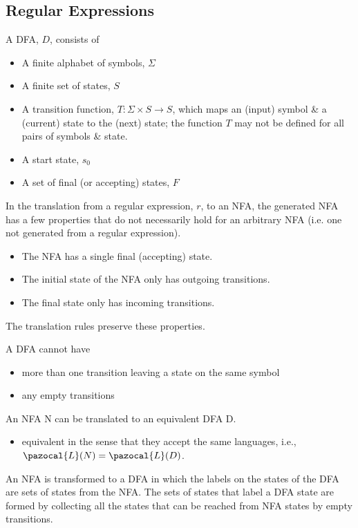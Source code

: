 \subsection{Regular Expressions}
A DFA, $D$, consists of
\begin{itemize}
    \item A finite alphabet of symbols, $\Sigma$
    \item A finite set of states, $S$
    \item A transition function, $T : \Sigma \times S \rightarrow S$, which maps an (input) symbol \& a (current) state to the (next) state; the function $T$ may not be defined for all pairs of symbols \& state. 
    \item A start state, $s_0$ 
    \item A set of final (or accepting) states, $F$
\end{itemize}


In the translation from a regular expression, $r$, to an NFA, the generated NFA has a few properties that do not necessarily hold for an arbitrary NFA (i.e. one not generated from a regular expression).
\begin{itemize}
    \item The NFA has a single final (accepting) state.
    \item The initial state of the NFA only has outgoing transitions.
    \item The final state only has incoming transitions.
\end{itemize}
The translation rules preserve these properties.

A DFA cannot have 
\begin{itemize}
    \item more than one transition leaving a state on the same symbol
    \item any empty transitions
\end{itemize}
An NFA N can be translated to an equivalent DFA D.
\begin{itemize}
    \item equivalent in the sense that they accept the same languages, i.e., $\pazocal{L}(N) = \pazocal{L}(D)$.
\end{itemize}

An NFA is transformed to a DFA in which the labels on the states of the DFA are sets of states from the NFA.
The sets of states that label a DFA state are formed by collecting all the states that can be reached from NFA states by empty transitions. 

